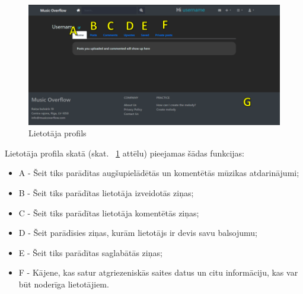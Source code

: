 \documentclass[12pt]{article}
\begin{document}
\begin{figure}[H]
\begin{center}
	\includegraphics[scale=0.6]{profile.png}
	\caption{Lietotāja profils}
	\label{fig:profile}
\end{center}
\end{figure}

Lietotāja profila skatā (skat. ~\ref{fig:profile} attēlu) pieejamas šādas funkcijas:

\begin{itemize}
	\item A - Šeit tiks parādītas augšupielādētās un komentētās mūzikas atdarinājumi;
	\item B - Šeit tiks parādītas lietotāja izveidotās ziņas;
	\item C - Šeit tiks parādītas lietotāja komentētās ziņas;
	\item D - Šeit parādīsies ziņas, kurām lietotājs ir devis savu balsojumu;
	\item E - Šeit tiks parādītas saglabātās ziņas;
	\item F - Kājene, kas satur atgriezeniskās saites datus un citu informāciju, kas var būt noderīga lietotājiem.
\end{itemize}
\end{document}
